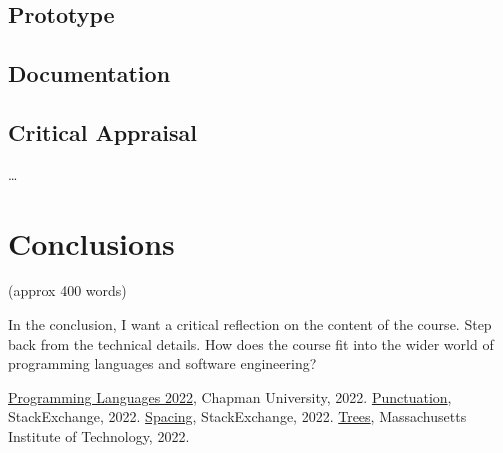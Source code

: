 \documentclass{article}
\theoremstyle{theorem}
\theoremstyle{definition}
\theoremstyle{remark}
\begin{document}
\subsection{Prototype}
\subsection{Documentation}
\subsection{Critical Appraisal}

\ldots

\section{Conclusions}\label{conclusions}

(approx 400 words)

In the conclusion, I want a critical reflection on the content of the course. Step back from the technical details. How does the course fit into the wider world of programming languages and software engineering?

\begin{thebibliography}{99}
 \href{https://github.com/alexhkurz/programming-languages-2022/blob/main/README.md}{Programming Languages 2022}, Chapman University, 2022.
 \href{https://tex.stackexchange.com/questions/2369/why-do-the-less-than-symbol-and-the-greater-than-symbol-appear-wrong-as}{Punctuation}, StackExchange, 2022.
 \href{https://tex.stackexchange.com/questions/14526/spaces-behind-textgreater-not-working-as-expected}{Spacing}, StackExchange, 2022.
 \href{http://sznfong.scripts.mit.edu/site/wp-content/uploads/2018/03/treedrawingtutorialv2.pdf}{Trees}, Massachusetts Institute of Technology, 2022.
\end{thebibliography}
\end{document}
